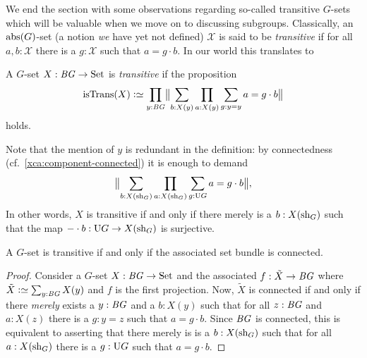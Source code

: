 \label{sec:transitiveGsets}
We end the section with some observations regarding so-called transitive $G$-sets which will be valuable when we move on to discussing subgroups.
Classically, an $\abstr(G)$-set (a notion \emph{we} have yet not defined) $\mathcal X$ is said to be \emph{transitive} if for all $a,b:\mathcal X$ there is a $g:\mathcal X$ such that $a=g\cdot b$.  In our world this translates to
\begin{definition}\label{def:transitiveGset}
  A $G$-set $X:\BG\to\Set$ is \emph{transitive} if the proposition
  \[
    \istrans(X) \defequi \prod_{y:\BG}
    \Trunc[\big]{\sum_{b:X(y)} \prod_{a:X(y)} \sum_{g:y=y} a=g\cdot b}
  \]
  holds.
\end{definition}
Note that the mention of $y$ is redundant in the definition: by
connectedness (cf.~\cref{xca:component-connected}) it is enough to
demand
\begin{displaymath}
  \Trunc[\big]{\sum_{b:X(\sh_G)}\prod_{a:X(\sh_G)}\sum_{g:\USym G}a=g\cdot b},
\end{displaymath}
In other words, $X$ is transitive if and only if there merely is a
$b:X(\sh_G)$ such that the map $-\cdot b:\USym G\to X(\sh_G)$ is
surjective.

\begin{lemma}
  \label{lem:conistrans}
  A $G$-set  is transitive if and only if the associated set bundle is connected.
\end{lemma}
\begin{proof}
  Consider a $G$-set $X:\BG\to\Set$ and the associated \covering
  $f:\tilde X\to\BG$ where $\tilde X\defequi\sum_{y:\BG}X(y)$ and $f$
  is the first projection.  Now, $\tilde X$ is connected if and only
  if there {\em merely} exists a $y:\BG$ and a $b:X(y)$ such that for
  all $z:\BG$ and $a:X(z)$ there is a $g:y=z$ such that $a=g\cdot b$.
  Since $\BG$ is connected, this is equivalent to asserting that there
  merely is is a $b:X(\sh_G)$ such that for all $a:X(\sh_G)$ there is
  a $g:\USym G$ such that $a=g\cdot b$.
\end{proof}

